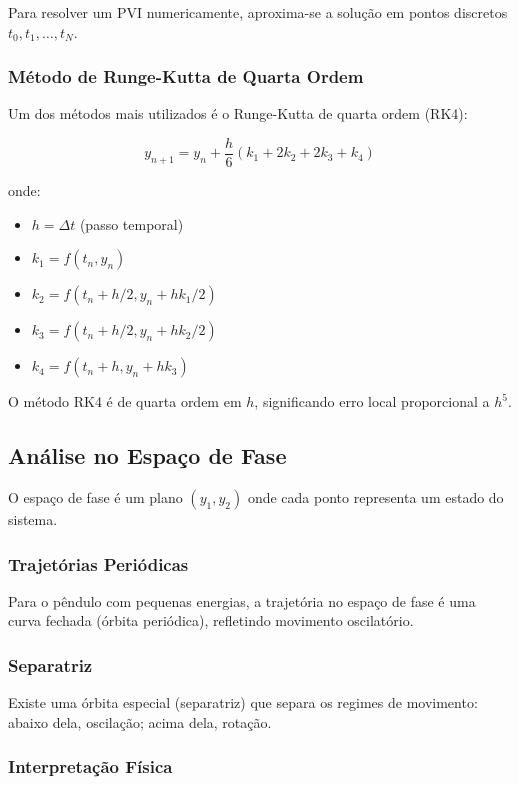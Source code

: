 \documentclass[12pt,a4paper]{article}
\begin{document}
Para resolver um PVI numericamente, aproxima-se a solução em pontos discretos $t_0, t_1, \ldots, t_N$.

\subsubsection{Método de Runge-Kutta de Quarta Ordem}

Um dos métodos mais utilizados é o Runge-Kutta de quarta ordem (RK4):

\begin{equation}
y_{n+1} = y_n + \frac{h}{6}(k_1 + 2k_2 + 2k_3 + k_4)
\end{equation}

onde:
\begin{itemize}
    \item $h = \Delta t$ (passo temporal)
    \item $k_1 = f(t_n, y_n)$
    \item $k_2 = f(t_n + h/2, y_n + hk_1/2)$
    \item $k_3 = f(t_n + h/2, y_n + hk_2/2)$
    \item $k_4 = f(t_n + h, y_n + hk_3)$
\end{itemize}

O método RK4 é de quarta ordem em $h$, significando erro local proporcional a $h^5$.

\subsection{Análise no Espaço de Fase}

O espaço de fase é um plano $(y_1, y_2)$ onde cada ponto representa um estado do sistema.

\subsubsection{Trajetórias Periódicas}

Para o pêndulo com pequenas energias, a trajetória no espaço de fase é uma curva fechada (órbita periódica), refletindo movimento oscilatório.

\subsubsection{Separatriz}

Existe uma órbita especial (separatriz) que separa os regimes de movimento: abaixo dela, oscilação; acima dela, rotação.

\subsubsection{Interpretação Física}
\end{document}
